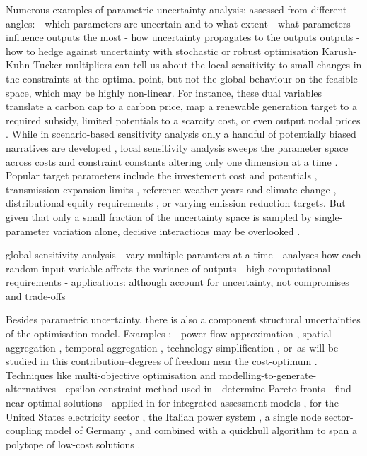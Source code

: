 Numerous examples of parametric uncertainty analysis:
assessed from different angles:
- which parameters are uncertain and to what extent
- what parameters influence outputs the most
- how uncertainty propagates to the outputs outputs
- how to hedge against uncertainty with stochastic or robust optimisation
Karush-Kuhn-Tucker multipliers
can tell us about the local sensitivity to small changes in the constraints at the optimal point,
but not the global behaviour on the feasible space, which may be highly non-linear.
For instance, these dual variables translate a carbon cap to a carbon price, map a renewable generation target to a required subsidy, limited potentials to a scarcity cost, or even output nodal prices \cite{marketvalue}.
While in scenario-based sensitivity analysis only
a handful of potentially biased narratives are developed \cite{DeCarolis2017,soroudi_decision_2013,usher_value_2015}, local sensitivity analysis sweeps the parameter space
across costs and constraint constants altering only one dimension at a time \cite{schlachtberger_cost_2018}.
Popular target parameters include the investement cost and potentials \cite{schlachtberger_cost_2018},
transmission expansion limits \cite{schlachtberger_benefits_2017},
reference weather years and climate change \cite{bloomfield_2021,impactofclimatechange},
distributional equity requirements \cite{sasse_regional_2020,sasse_distributional_2019},
or varying emission reduction targets.
But given that only a small fraction of the uncertainty space
is sampled by single-parameter variation alone,
decisive interactions may be overlooked \cite{pizarro-alonso_uncertainties_2019}.

global sensitivity analysis
- vary multiple paramters at a time
- analyses how each random input variable affects the variance of outputs \cite{sudret_global_2008}
- high computational requirements \cite{usher_value_2015,pizarro-alonso_uncertainties_2019,moret_robust_2016}
- applications: \cite{trondle_trade-offs_2020,fais_impact_2016,mavromatidis_uncertainty_2018,pilpola_analyzing_2020}
although account for uncertainty, not compromises and trade-offs


Besides parametric uncertainty, there is also a component structural uncertainties of the
optimisation model.
Examples :
- power flow approximation \cite{flowandlosses}, spatial aggregation \cite{hoersch_spatial_2017}, temporal aggregation \cite{kotzur_tsa_2018}, technology simplification \cite{DeCarolis2017}, or--as will be studied in this contribution--degrees of freedom near the cost-optimum \cite{nearoptimal}.
Techniques like multi-objective optimisation and modelling-to-generate-alternatives
- epsilon constraint method used in \cite{nearoptimal}
- determine Pareto-fronts \cite{mavrotas_effective_2009}
- find near-optimal solutions
- applied in for integrated assessment models \cite{Price2017}, 
for the United States electricity sector \cite{DeCarolis2016},
the Italian power system \cite{lombardi_policy_2020},
a single node sector-coupling model of Germany \cite{nacken_integrated_2019},
and combined with a quickhull algorithm to span a polytope of low-cost solutions \cite{pedersen_modeling_2020}.

